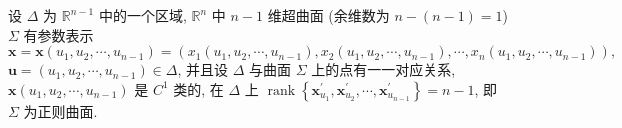 \begin{definition}\label{def:11.1.3}
设 $\Delta$ 为 $\mathbb{R}^{n-1}$ 中的一个区域, $\mathbb{R}^{n}$ 中 $n-1$ 维超曲面 (余维数为 $n-(n-1)=1$) $\Sigma$ 有参数表示
\[
  \boldsymbol{x}=\boldsymbol{x}\left(u_{1}, u_{2}, \cdots, u_{n-1}\right)=\left(x_{1}\left(u_{1}, u_{2}, \cdots, u_{n-1}\right), x_{2}\left(u_{1}, u_{2}, \cdots, u_{n-1}\right), \cdots, x_{n}\left(u_{1}, u_{2}, \cdots, u_{n-1}\right)\right),
\]
$\boldsymbol{u}=\left(u_{1}, u_{2}, \cdots, u_{n-1}\right) \in \Delta$, 并且设 $\Delta$ 与曲面 $\Sigma$ 上的点有一一对应关系, $\boldsymbol{x}\left(u_{1}, u_{2}, \cdots, u_{n-1}\right)$ 是 $C^{1}$ 类的, 在 $\Delta$ 上 $\operatorname{rank}\left\{\boldsymbol{x}_{u_{1}}^{\prime}, \boldsymbol{x}_{u_{2}}^{\prime}, \cdots, \boldsymbol{x}_{u_{n-1}}^{\prime}\right\}=n-1$, 即 $\Sigma$ 为正则曲面.


\end{definition}
